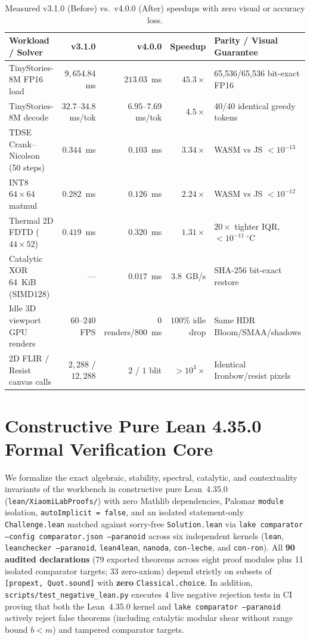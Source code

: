 \documentclass[11pt,a4paper]{amsart}
\newcommand{\code}[1]{{\small\nolinkurl{#1}}}
\theoremstyle{remark}
\begin{document}
\begin{table}[htbp]
\centering
\caption{Measured v3.1.0 (Before) vs.\ v4.0.0 (After) speedups with zero visual or accuracy loss.}
\label{tab:perf}
\scriptsize\setlength{\tabcolsep}{2.2pt}
\begin{tabular}{@{}lrrrl@{}}
\toprule
Workload / Solver & v3.1.0 & v4.0.0 & Speedup & Parity / Visual Guarantee \\
\midrule
TinyStories-8M FP16 load & $9{,}654.84$~ms & $213.03$~ms & $45.3\times$ & 65,536/65,536 bit-exact FP16 \\
TinyStories-8M decode & $32.7\text{--}34.8$~ms/tok & $6.95\text{--}7.69$~ms/tok & $4.5\times$ & 40/40 identical greedy tokens \\
TDSE Crank--Nicolson (50 steps) & $0.344$~ms & $0.103$~ms & $3.34\times$ & WASM vs JS $< 10^{-13}$ \\
INT8 $64\times 64$ matmul & $0.282$~ms & $0.126$~ms & $2.24\times$ & WASM vs JS $< 10^{-12}$ \\
Thermal 2D FDTD ($44\times 52$) & $0.419$~ms & $0.320$~ms & $1.31\times$ & $20\times$ tighter IQR, $<10^{-11}~^\circ$C \\
Catalytic XOR 64~KiB (SIMD128) & --- & $0.017$~ms & $3.8$~GB/s & SHA-256 bit-exact restore \\
Idle 3D viewport GPU renders & $60\text{--}240$~FPS & $0$ renders/800~ms & $100\%$ idle drop & Same HDR Bloom/SMAA/shadows \\
2D FLIR / Resist canvas calls & $2{,}288$ / $12{,}288$ & $2$ / $1$ blit & $>10^3\times$ & Identical Ironbow/resist pixels \\
\bottomrule
\end{tabular}
\end{table}

\section{Constructive Pure Lean 4.35.0 Formal Verification Core}

We formalize the exact algebraic, stability, spectral, catalytic, and
contextuality invariants of the workbench in constructive pure Lean~4.35.0
(\code{lean/XiaomiLabProofs/}) with zero Mathlib dependencies, Palomar
\code{module} isolation, \texttt{autoImplicit = false}, and an isolated
statement-only \code{Challenge.lean} matched against sorry-free
\code{Solution.lean} via \texttt{lake comparator --config comparator.json --paranoid}
across six independent kernels (\code{lean}, \texttt{leanchecker --paranoid},
\code{lean4lean}, \code{nanoda}, \code{con-leche}, and \code{con-ron}).
All \textbf{90 audited declarations} (79 exported theorems across eight proof
modules plus 11 isolated comparator targets; 33 zero-axiom) depend strictly on
subsets of \texttt{[propext, Quot.sound]} with \textbf{zero}
\code{Classical.choice}. In addition, \code{scripts/test_negative_lean.py}
executes 4 live negative rejection tests in CI proving that both the
Lean~4.35.0 kernel and \texttt{lake comparator --paranoid} actively reject
false theorems (including catalytic modular shear without range bound $b < m$)
and tampered comparator targets.
\end{document}
